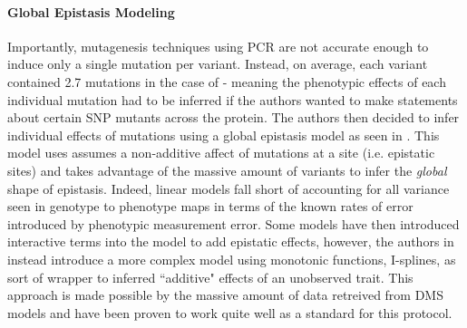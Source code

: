 \documentclass{article}
\begin{document}
\paragraph{Global Epistasis Modeling}
Importantly, mutagenesis techniques using PCR are not accurate enough to induce only a single mutation per variant.
Instead, on average, each variant contained 2.7 mutations in the case of \citet{Starr2020} - meaning the phenotypic effects of each individual mutation had to be inferred if the authors wanted to make statements about certain SNP mutants across the protein.
The authors then decided to infer individual effects of mutations using a global epistasis model as seen in \cite{Otwinowski2018}.
This model uses assumes a non-additive affect of mutations at a site (i.e. epistatic sites) and takes advantage of the massive amount of variants to infer the \textit{global} shape of epistasis.
Indeed, linear models fall short of accounting for all variance seen in genotype to phenotype maps in terms of the known rates of error introduced by phenotypic measurement error.
Some models have then introduced interactive terms into the model to add epistatic effects, however, the authors in \citet{Otwinowski2018} instead introduce a more complex model using monotonic functions, I-splines, as sort of wrapper to inferred ``additive" effects of an unobserved trait.
This approach is made possible by the massive amount of data retreived from DMS models and have been proven to work quite well as a standard for this protocol.
\end{document}
